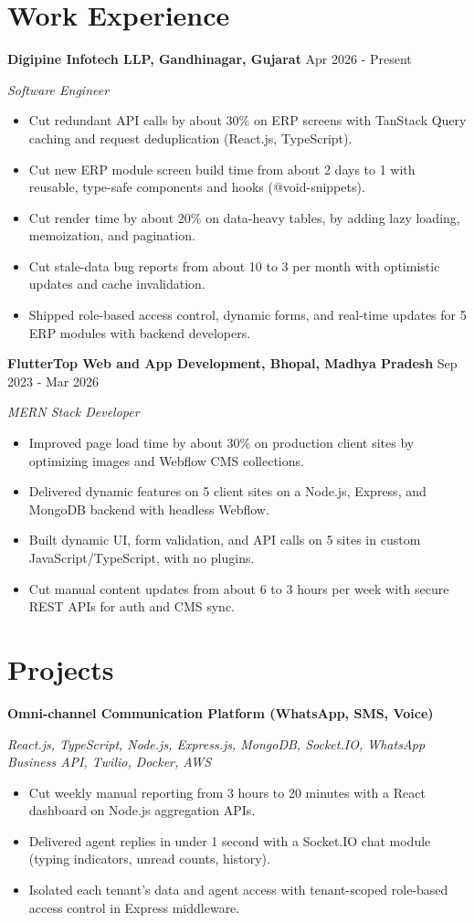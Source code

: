 \documentclass[a4paper,10pt]{article}
\newcommand{\company}[2]{\textbf{#1} \hfill #2\par}
\newcommand{\position}[2]{\textit{#1} \hfill \textit{#2}\par\vspace{1pt}}
\newcommand{\project}[2]{\vspace{2pt}\textbf{#1}\par\textit{#2}\par\vspace{1pt}}
\begin{document}
\section{Work Experience}
\company{Digipine Infotech LLP, Gandhinagar, Gujarat}{Apr 2026 - Present}
\position{Software Engineer}{}
\begin{itemize}
  \item Cut redundant API calls by about 30\% on ERP screens with TanStack Query caching and request deduplication (React.js, TypeScript).
  \item Cut new ERP module screen build time from about 2 days to 1 with reusable, type-safe components and hooks (@void-snippets).
  \item Cut render time by about 20\% on data-heavy tables, by adding lazy loading, memoization, and pagination.
  \item Cut stale-data bug reports from about 10 to 3 per month with optimistic updates and cache invalidation.
  \item Shipped role-based access control, dynamic forms, and real-time updates for 5 ERP modules with backend developers.
\end{itemize}

\vspace{3pt}
\company{FlutterTop Web and App Development, Bhopal, Madhya Pradesh}{Sep 2023 - Mar 2026}
\position{MERN Stack Developer}{}
\begin{itemize}
  \item Improved page load time by about 30\% on production client sites by optimizing images and Webflow CMS collections.
  \item Delivered dynamic features on 5 client sites on a Node.js, Express, and MongoDB backend with headless Webflow.
  \item Built dynamic UI, form validation, and API calls on 5 sites in custom JavaScript/TypeScript, with no plugins.
  \item Cut manual content updates from about 6 to 3 hours per week with secure REST APIs for auth and CMS sync.
\end{itemize}

\section{Projects}
\project{Omni-channel Communication Platform (WhatsApp, SMS, Voice)}{React.js, TypeScript, Node.js, Express.js, MongoDB, Socket.IO, WhatsApp Business API, Twilio, Docker, AWS}
\begin{itemize}
  \item Cut weekly manual reporting from 3 hours to 20 minutes with a React dashboard on Node.js aggregation APIs.
  \item Delivered agent replies in under 1 second with a Socket.IO chat module (typing indicators, unread counts, history).
  \item Isolated each tenant's data and agent access with tenant-scoped role-based access control in Express middleware.
\end{itemize}
\end{document}
